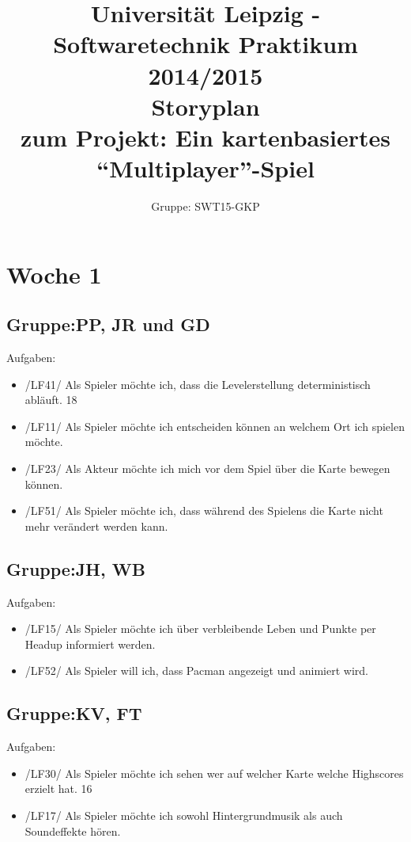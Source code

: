 \documentclass[11pt,a4paper]{article}
\author{Gruppe: SWT15-GKP}
\title{Universität Leipzig - Softwaretechnik Praktikum 2014/2015 \\  Storyplan \\ zum Projekt: Ein kartenbasiertes “Multiplayer”-Spiel}
\begin{document}
\maketitle

\clearpage

\flushleft


\section*{Woche 1}
\subsection*{Gruppe:PP, JR und GD} \par\bigskip
Aufgaben:
\begin{itemize}
\item /LF41/ Als Spieler möchte ich, dass die Levelerstellung deterministisch abläuft. 18
\item /LF11/ Als Spieler möchte ich entscheiden können an welchem Ort ich spielen möchte.
\item /LF23/ Als Akteur möchte ich mich vor dem Spiel über die Karte bewegen können.
\item /LF51/ Als Spieler möchte ich, dass während des Spielens die Karte nicht mehr verändert werden kann. 
\end{itemize}


\subsection*{Gruppe:JH, WB} \par\bigskip
Aufgaben:
\begin{itemize}
\item /LF15/ Als Spieler möchte ich über verbleibende Leben und Punkte per Headup informiert werden.
\item /LF52/ Als Spieler will ich, dass Pacman angezeigt und animiert wird.
\end{itemize}

\subsection*{Gruppe:KV, FT} \par\bigskip
Aufgaben:
\begin{itemize}
\item /LF30/ Als Spieler möchte ich sehen wer auf welcher Karte welche Highscores
erzielt hat. 16
\item /LF17/ Als Spieler möchte ich sowohl Hintergrundmusik als auch Soundeffekte hören.
\end{itemize}
\end{document}
